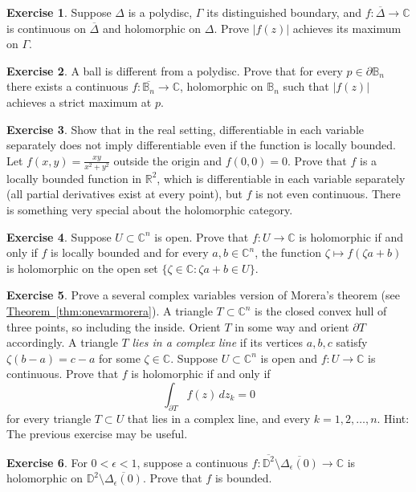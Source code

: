 \documentclass[12pt,openany]{book}
\newcommand{\sabs}[1]{\lvert {#1} \rvert}
\newcommand{\C}{{\mathbb{C}}}
\newcommand{\R}{{\mathbb{R}}}
\newcommand{\D}{{\mathbb{D}}}
\newcommand{\bB}{{\mathbb{B}}}
\theoremstyle{plain}
\theoremstyle{remark}
\theoremstyle{definition}
\newenvironment{exbox}{%
    \def\FrameCommand{\vrule width 1pt \relax\hspace{10pt}}%
    \MakeFramed{\advance\hsize-\width\FrameRestore}%
}{%
    \endMakeFramed
}
\theoremstyle{exercise}
\newtheorem{exercise}{Exercise}[section]
\theoremstyle{example}
\newcommand{\thmref}[1]{\hyperref[#1]{Theorem~\ref*{#1}}}
\begin{document}
\begin{exbox}
\begin{exercise}
Suppose $\Delta$ is a polydisc, $\Gamma$ its distinguished boundary,
and $f \colon \overline{\Delta} \to \C$ is continuous on $\overline{\Delta}$
and holomorphic on $\Delta$.
Prove
$\sabs{f(z)}$ achieves its maximum on $\Gamma$.
\end{exercise}

\begin{exercise}
A ball is different from a polydisc.  Prove that for every $p \in \partial \bB_n$
there exists a continuous $f \colon \overline{\bB_n} \to \C$, holomorphic
on $\bB_n$ such that $\sabs{f(z)}$ achieves a strict maximum at $p$.
\end{exercise}

\begin{exercise}
Show that in the real setting, differentiable
in each variable separately does not imply differentiable even if
the function is locally bounded.
Let $f(x,y) = \frac{xy}{x^2+y^2}$ outside the origin
and $f(0,0) = 0$.  Prove that $f$ is a
locally bounded function in $\R^2$, which is differentiable
in each variable separately (all partial derivatives exist at every point), but 
$f$ is not even continuous.  There is something very
special about the holomorphic category.
\end{exercise}

\begin{exercise}
Suppose $U \subset \C^n$ is open.
Prove that $f \colon U \to \C$ is holomorphic if and only if
$f$ is locally bounded and
for every $a,b \in \C^n$, the
function
$\zeta \mapsto f(\zeta a + b)$ is holomorphic on
the open set $\{ \zeta \in \C : \zeta a + b \in U \}$.
\end{exercise}

\begin{exercise}
Prove a several complex variables version of Morera's theorem (see
\thmref{thm:onevarmorera}).
A triangle $T \subset \C^n$ is the closed convex hull of three points, so
including the inside.  Orient $T$ in some way %
and orient $\partial T$ accordingly.
A triangle $T$ \emph{lies in a complex line} if
its vertices $a,b,c$ satisfy
$\zeta (b-a) = c-a$ for some $\zeta \in \C$.
Suppose $U \subset \C^n$ is open and $f \colon U \to \C$ is continuous.
Prove that $f$ is holomorphic if and only if
\begin{equation*}
\int_{\partial T} f(z) \, dz_k = 0
\end{equation*}
for every triangle $T \subset U$ that lies in a complex line,
and every $k=1,2,\ldots,n$.
Hint: The previous exercise may be useful.
\end{exercise}

\begin{exercise}
For $0 < \epsilon < 1$,
suppose a continuous
$f \colon \overline{\D^2} \setminus \overline{\Delta_\epsilon(0)} \to \C$ is holomorphic
on $\D^2 \setminus \overline{\Delta_\epsilon(0)}$.
Prove that $f$ is bounded.
\end{exercise}
\end{exbox}
\end{document}
